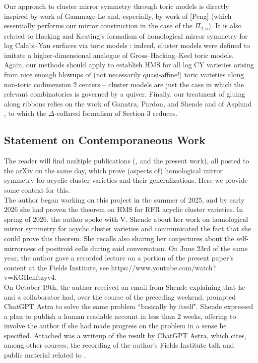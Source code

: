 \documentclass[11pt]{amsart}
\theoremstyle{definition}
\theoremstyle{remark}
\numberwithin{equation}{section}
\begin{document}
Our approach to cluster mirror symmetry through toric models is directly inspired by work of Gammage-Le and, especially, by work of [Peng] (which essentially performs our mirror construction in the case of the $\Pi_{2,n}$). It is also related to Hacking and Keating’s formalism of homological mirror symmetry for log Calabi–Yau surfaces via toric models \cite{HK}: indeed, cluster models were defined to imitate a higher-dimensional analogue of Gross–Hacking–Keel toric models. Again, our methods should apply to establish HMS for all log CY varieties arising from nice enough blowups of (not necessarily quasi-affine!) toric varieties along non-toric codimension $2$ centers -- cluster models are just the case in which the relevant combinatorics is governed by a quiver. Finally, our treatment of gluing along ribbons relies on the work of Ganatra, Pardon, and Shende \cite{GPSI} and of Asplund \cite{Asplund}, to which the $\Delta$-collared formalism of Section 3 reduces.

\subsection{Statement on Contemporaneous Work}
The reader will find multiple publications (\cite{SSWZ}, \cite{HS} and the present work), all posted to the arXiv on the same day, which prove (aspects of) homological mirror symmetry for acyclic cluster varieties and their generalizations. Here we provide some context for this.\\

The author began working on this project in the summer of 2025, and by early 2026 she had proven the theorem on HMS for RFR acyclic cluster varieties. In spring of 2026, the author spoke with V. Shende about her work on homological mirror symmetry for acyclic cluster varieties and communicated the fact that she could prove this theorem. She recalls also sharing her conjectures about the self-mirrorness of positroid cells during said conversation. On June 23rd of the same year, the author gave a recorded lecture on a portion of the present paper's content at the Fields Institute, see https://www.youtube.com/watch?v=KGHenftzyv4.\\

On October 19th, the author received an email from Shende explaining that he and a collaborator had, over the course of the preceding weekend, prompted ChatGPT Astra to solve the same problem ``basically by itself". Shende expressed a plan to publish a human readable account in less than $2$ weeks, offering to involve the author if she had made progress on the problem in a sense he specified. Attached was a writeup of the result by ChatGPT Astra, which cites, among other sources, the recording of the author’s Fields Institute talk and public material related to \cite{SSWZ}.\\
\end{document}
